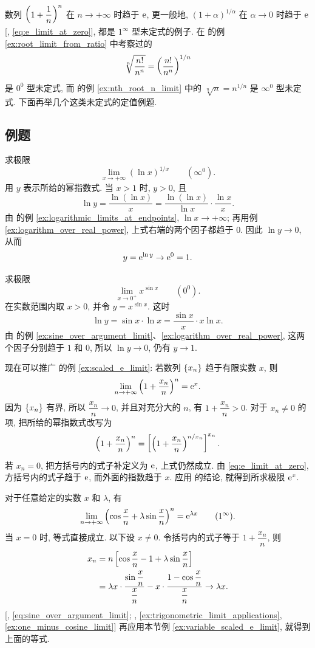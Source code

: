数列 $\left( 1+\dfrac1n \right)^n$ 在 $n\to+\infty$ 时趋于 $\mathrm{e}$,
更一般地, $(1+\alpha)^{1/\alpha}$ 在 $\alpha\to0$ 时趋于 $\mathrm{e}$
[, \eqref{eq:e_limit_at_zero}], 都是 $1^\infty$ 型未定式的例子.
在  的例 \ref{ex:root_limit_from_ratio} 中考察过的
$$
\sqrt[n]{\frac{n!}{n^n}}=\left( \frac{n!}{n^n} \right)^{1/n}
$$
是 $0^0$ 型未定式, 而  的例 \ref{ex:nth_root_n_limit} 中的
$\sqrt[n]n=n^{1/n}$ 是 $\infty^0$ 型未定式.
下面再举几个这类未定式的定值例题.

\subsection{例题}\label{subsec:79}
\label{ex:logarithm_variable_root_limit}
求极限
$$
\lim_{x\to+\infty}(\ln x)^{1/x}\qquad(\infty^0).
$$
用 $y$ 表示所给的幂指数式. 当 $x>1$ 时, $y>0$, 且
$$
\ln y=\frac{\ln(\ln x)}x
=\frac{\ln(\ln x)}{\ln x}\cdot\frac{\ln x}x.
$$
由  的例 \ref{ex:logarithmic_limits_at_endpoints}, $\ln x\to+\infty$;
再用例 \ref{ex:logarithm_over_real_power}, 上式右端的两个因子都趋于 $0$.
因此 $\ln y\to0$, 从而
$$
y=\mathrm{e}^{\ln y}\to\mathrm{e}^0=1.
$$

\label{ex:power_sine_limit_at_zero}
求极限
$$
\lim_{x\to0^+}x^{\sin x}\qquad(0^0).
$$
在实数范围内取 $x>0$, 并令 $y=x^{\sin x}$. 这时
$$
\ln y=\sin x\cdot\ln x=\frac{\sin x}x\cdot x\ln x.
$$
由  的例 \ref{ex:sine_over_argument_limit}、\ref{ex:logarithm_over_real_power},
这两个因子分别趋于 $1$ 和 $0$, 所以 $\ln y\to0$, 仍有 $y\to1$.

\label{ex:variable_scaled_e_limit}
现在可以推广  的例 \ref{ex:scaled_e_limit}:
{\kaishu 若数列 $\{x_{n}\}$ 趋于有限实数 $x$, 则
$$
\lim_{n\to+\infty}\left( 1+\frac{x_n}n \right)^n=\mathrm{e}^x.
$$}
因为 $\{x_{n}\}$ 有界, 所以 $\dfrac{x_n}n\to0$,
并且对充分大的 $n$, 有 $1+\dfrac{x_n}n>0$.
对于 $x_n\neq0$ 的项, 把所给的幂指数式改写为
$$
\left( 1+\frac{x_n}n \right)^n
=\left[ \left( 1+\frac{x_n}n \right)^{n/x_n} \right]^{x_n}.
$$
若 $x_n=0$, 把方括号内的式子补定义为 $\mathrm{e}$, 上式仍然成立.
由 \eqref{eq:e_limit_at_zero}, 方括号内的式子趋于 $\mathrm{e}$, 而外面的指数趋于 $x$.
应用  的结论, 就得到所求极限 $\mathrm{e}^x$.

\label{ex:trigonometric_power_sequence_limit}
对于任意给定的实数 $x$ 和 $\lambda$, 有
$$
\lim_{n\to+\infty}\left( \cos\frac xn+\lambda\sin\frac xn \right)^n
=\mathrm{e}^{\lambda x}\qquad(1^\infty).
$$
当 $x=0$ 时, 等式直接成立. 以下设 $x\neq0$.
令括号内的式子等于 $1+\dfrac{x_n}n$, 则
$$
\begin{aligned}
x_n
&=n\left[ \cos\frac xn-1+\lambda\sin\frac xn \right]\\
&=\lambda x\cdot\frac{\sin\dfrac xn}{\dfrac xn}
-x\cdot\frac{1-\cos\dfrac xn}{\dfrac xn}\to\lambda x.
\end{aligned}
$$
[, \eqref{eq:sine_over_argument_limit}; 
, \ref{ex:trigonometric_limit_applications}, \ref{ex:one_minus_cosine_limit}]
再应用本节例 \ref{ex:variable_scaled_e_limit}, 就得到上面的等式.

